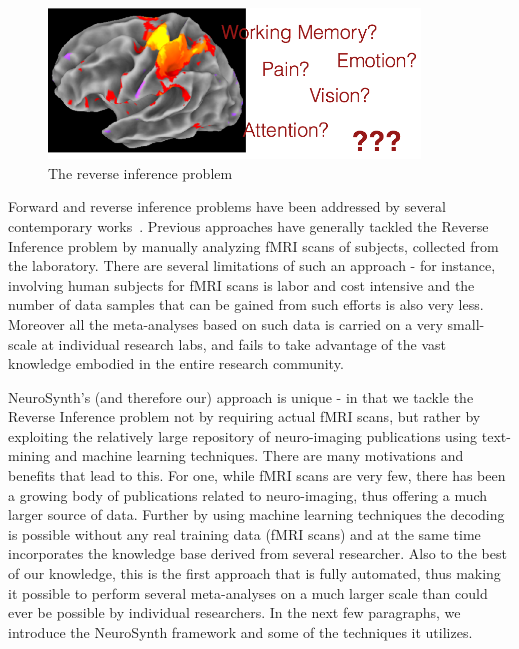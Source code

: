 \documentclass{article} %
\begin{document}
\begin{figure}[h]
\begin{center}
\includegraphics[height=4cm]{revinf.png}
\end{center}
\caption{The reverse inference problem}
\label{fig:revinf}
\end{figure}

Forward and reverse inference problems have been addressed by several contemporary works~\cite{schwartz2013mapping, PMSKBY12, sanmi2013multi, yarkoni2011large}. Previous approaches have generally tackled the Reverse Inference problem by manually analyzing fMRI scans of subjects, collected from the laboratory. There are several limitations of such an approach - for instance, involving human subjects for fMRI scans is labor and cost intensive and the number of data samples that can be gained from such efforts is also very less. Moreover all the meta-analyses based on such data is carried on a very small-scale at individual research labs, and fails to take advantage of the vast knowledge embodied in the entire research community. 

NeuroSynth's (and therefore our) approach is unique - in that we tackle the Reverse Inference problem not by requiring actual fMRI scans, but rather by exploiting the relatively large repository of neuro-imaging publications using text-mining and machine learning techniques.  There are many motivations and benefits that lead to this. For one, while fMRI scans are very few, there has been a growing body of publications related to neuro-imaging, thus offering a much larger source of data. Further by using machine learning techniques the decoding is possible without any real training data (fMRI scans) and at the same time incorporates the knowledge base derived from several researcher. Also to the best of our knowledge, this is the first approach that is fully automated, thus making it possible to perform several meta-analyses on a much larger scale than could ever be possible by individual researchers.  In the next few paragraphs, we introduce the NeuroSynth framework and some of the techniques it utilizes.
\end{document}
